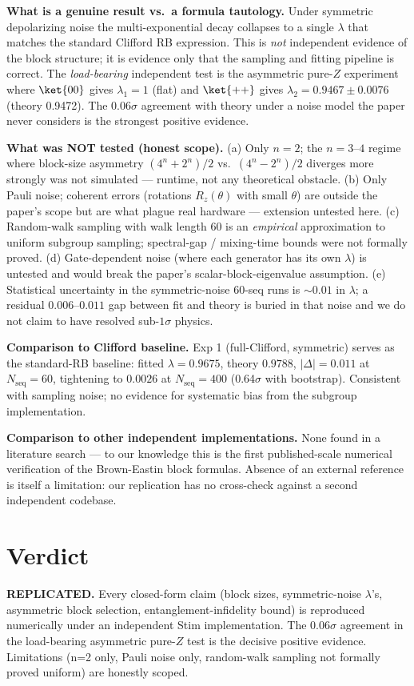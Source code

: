 \documentclass[11pt]{article}
\begin{document}
\textbf{What is a genuine result vs.\ a formula tautology.}
Under symmetric depolarizing noise the multi-exponential decay collapses to a
single $\lambda$ that matches the standard Clifford RB expression. This is
\emph{not} independent evidence of the block structure; it is evidence only
that the sampling and fitting pipeline is correct. The \emph{load-bearing}
independent test is the asymmetric pure-$Z$ experiment where $\ket{00}$ gives
$\lambda_1 = 1$ (flat) and $\ket{++}$ gives $\lambda_2 = 0.9467 \pm 0.0076$
(theory 0.9472). The $0.06\sigma$ agreement with theory under a noise model
the paper never considers is the strongest positive evidence.

\textbf{What was NOT tested (honest scope).}
(a) Only $n=2$; the $n=3$--$4$ regime where block-size asymmetry
$(4^n+2^n)/2$ vs.\ $(4^n-2^n)/2$ diverges more strongly was not simulated
--- runtime, not any theoretical obstacle. (b) Only Pauli noise; coherent
errors (rotations $R_z(\theta)$ with small $\theta$) are outside the paper's
scope but are what plague real hardware --- extension untested here.
(c) Random-walk sampling with walk length 60 is an \emph{empirical}
approximation to uniform subgroup sampling; spectral-gap / mixing-time
bounds were not formally proved. (d) Gate-dependent noise (where each
generator has its own $\lambda$) is untested and would break the paper's
scalar-block-eigenvalue assumption. (e) Statistical uncertainty in the
symmetric-noise 60-seq runs is $\sim 0.01$ in $\lambda$; a residual
$0.006$--$0.011$ gap between fit and theory is buried in that noise and
we do not claim to have resolved sub-$1\sigma$ physics.

\textbf{Comparison to Clifford baseline.} Exp 1 (full-Clifford, symmetric)
serves as the standard-RB baseline: fitted $\lambda=0.9675$, theory $0.9788$,
$|\Delta|=0.011$ at $N_{\mathrm{seq}}=60$, tightening to $0.0026$ at
$N_{\mathrm{seq}}=400$ (0.64$\sigma$ with bootstrap). Consistent with sampling
noise; no evidence for systematic bias from the subgroup implementation.

\textbf{Comparison to other independent implementations.} None found in a
literature search --- to our knowledge this is the first published-scale
numerical verification of the Brown-Eastin block formulas. Absence of an
external reference is itself a limitation: our replication has no cross-check
against a second independent codebase.

\section{Verdict}
\textbf{REPLICATED.} Every closed-form claim (block sizes, symmetric-noise
$\lambda$'s, asymmetric block selection, entanglement-infidelity bound)
is reproduced numerically under an independent Stim implementation. The
$0.06\sigma$ agreement in the load-bearing asymmetric pure-$Z$ test is the
decisive positive evidence. Limitations (n=2 only, Pauli noise only,
random-walk sampling not formally proved uniform) are honestly scoped.
\end{document}
